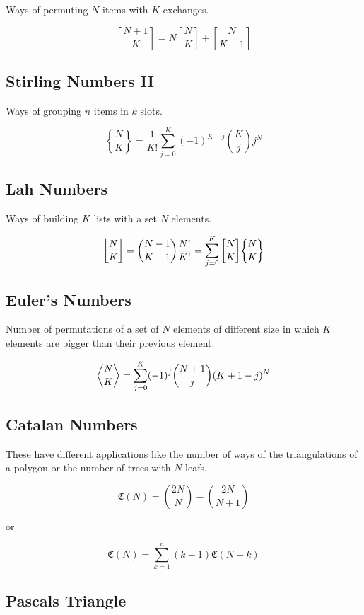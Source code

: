 Ways of permuting \(N\) items with \(K\) exchanges.

\[
    \genfrac{[}{]}{0pt}{}{N + 1}{K} = N \genfrac{[}{]}{0pt}{}{N}{K} + \genfrac{[}{]}{0pt}{}{N}{K - 1}
\]

\subsection{Stirling Numbers II}

Ways of grouping \(n\) items in \(k\) slots.

\[
    \genfrac{\{}{\}}{0pt}{}{N}{K} = \frac{1}{K!} \sum_{j=0}^{K} (-1)^{K - j} \binom{K}{j} j^N
\]

\subsection{Lah Numbers}

Ways of building \(K\) lists with a set \(N\) elements.

\[
    \genfrac{\lfloor}{\rfloor}{0pt}{}{N}{K} = \binom{N - 1}{K - 1} \frac{N!}{K!} = \sum_{j=0}^{K} 
    \genfrac{[}{]}{0pt}{}{N}{K} \genfrac{\{}{\}}{0pt}{}{N}{K}
\]

\subsection{Euler's Numbers}

Number of permutations of a set of \(N\) elements of different size in which
\(K\) elements are bigger than their previous element.

\[
    \genfrac{\langle}{\rangle}{0pt}{}{N}{K} = \sum_{j = 0}^{K} (-1)^j \binom{N + 1}{j} (K + 1 - j)^N
\]

\subsection{Catalan Numbers}

These have different applications like the number of ways of the triangulations of
a polygon or the number of trees with \(N\) leafs.

\[
    \mathfrak{C}(N) = \binom{2N}{N} - \binom{2N}{N + 1}
\]

or

\[
    \mathfrak{C}(N) = \sum_{k=1}^{n}(k - 1) \mathfrak{C}(N - k)
\]

\subsection{Pascals Triangle}

